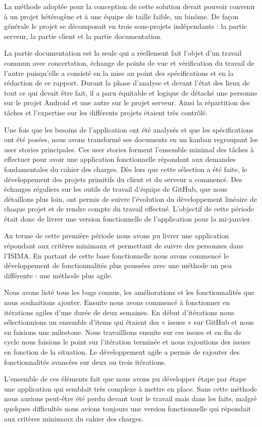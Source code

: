 La méthode adoptée pour la conception de cette solution devait pouvoir convenir à un projet hétérogène et à une équipe de taille faible, un binôme. De façon générale le projet se décomposait en trois sous-projets indépendants : la partie serveur, la partie client et la partie documentation.

La partie documentation est la seule qui a réellement fait l’objet d’un travail commun avec concertation, échange de points de vue et vérification du travail de l’autre puisqu’elle a consisté en la mise au point des spécifications et en la rédaction de ce rapport. Durant la phase d’analyse et devant l’état des lieux de tout ce qui devait être fait, il a paru équitable et logique de détaché une personne sur le projet Android et une autre sur le projet serveur. Ainsi la répartition des tâches et l’expertise sur les différents projets étaient très contrôlé.

Une fois que les besoins de l’application ont été analysés et que les spécifications ont été posées, nous avons transformé ses documents en un kanban regroupant les user stories principales. Ces user stories forment l’ensemble minimal des tâches à effectuer pour avoir une application fonctionnelle répondant aux demandes fondamentales du cahier des charges. Dès lors que cette sélection a été faite, le développement des projets primitifs du client et du serveur a commencé. Des échanges réguliers sur les outils de travail d’équipe de GitHub, que nous détaillons plus loin, ont permis de suivre l’évolution du développement linéaire de chaque projet et de rendre compte du travail effectué. L’objectif de cette période était donc de livrer une version fonctionnelle de l’application pour la mi-janvier.

Au terme de cette première période nous avons pu livrer une application répondant aux critères minimaux et permettant de suivre des personnes dans l’ISIMA. En partant de cette base fonctionnelle nous avons commencé le développement de fonctionnalités plus poussées avec une méthode un peu différente : une méthode plus agile.

Nous avons listé tous les bugs connus, les améliorations et les fonctionnalités que nous souhaitions ajouter. Ensuite nous avons commencé à fonctionner en itérations agiles d’une durée de deux semaines. En début d’itérations nous sélectionnions un ensemble d’items qui étaient des « issues » sur GitHub et nous en faisions une milestone. Nous travaillions ensuite sur ces issues et en fin de cycle nous faisions le point sur l’itération terminée et nous rajoutions des issues en fonction de la situation. Le développement agile a permis de rajouter des fonctionnalités avancées sur deux ou trois itérations.

L’ensemble de ces éléments fait que nous avons pu développer étape par étape une application qui semblait très complexe à mettre en place. Sans cette méthode nous aurions peut-être été perdu devant tout le travail mais dans les faits, malgré quelques difficultés nous avions toujours une version fonctionnelle qui répondait aux critères minimaux du cahier des charges.
